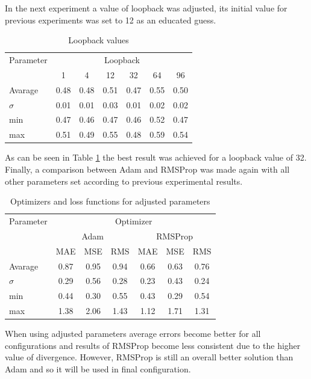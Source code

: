 \documentclass{kybernetika}
\begin{document}
In the next experiment a value of loopback was adjusted, its initial value for previous experiments
was set to 12 as an educated guess.
\begin{table}[htb] 
	\centering
	\caption{Loopback values}
	\label{tab:loopback}
	\begin{tabular}{l*{6}{c}}
		\hline
		\hline
		Parameter& \multicolumn{6}{c}{Loopback}  \\
		& 1& 4& 12& 32& 64& 96\\
		\hline
		Avarage & 0.48 & 0.48 & 0.51 & 0.47 & 0.55 & 0.50  \\
		$\sigma$ & 0.01 & 0.01 & 0.03 & 0.01 & 0.02 & 0.02  \\
		min & 0.47 & 0.46 & 0.47 & 0.46 & 0.52 & 0.47  \\
		max & 0.51 & 0.49 & 0.55 & 0.48 & 0.59 & 0.54  \\
		\hline
		\hline
	\end{tabular}
\end{table}
As can be seen in Table \ref{tab:loopback} the best result was achieved for a loopback value of 32.
Finally, a comparison between Adam and RMSProp was made again with all other parameters 
set according to previous experimental results.
\begin{table}[htb] 
	\centering
	\caption{Optimizers and loss functions for adjusted parameters}
	\label{tab:optimizers2}
	\begin{tabular}{l*{6}{c}}
		\hline
		\hline
		Parameter& \multicolumn{6}{c}{Optimizer}  \\
		&\multicolumn{3}{c}{Adam}&\multicolumn{3}{c}{RMSProp}\\
		\hline
		& MAE & MSE & RMS & MAE & MSE & RMS  \\
		Avarage & 0.87 & 0.95 & 0.94 & 0.66 & 0.63 & 0.76  \\
		$\sigma$ & 0.29 & 0.56 & 0.28 & 0.23 & 0.43 & 0.24  \\
		min & 0.44 & 0.30 & 0.55 & 0.43 & 0.29 & 0.54  \\
		max & 1.38 & 2.06 & 1.43 & 1.12 & 1.71 & 1.31  \\
		\hline
		\hline
	\end{tabular}
\end{table}
When using adjusted parameters average errors become better for all configurations and
results of RMSProp become less consistent due to the higher value of divergence.
However, RMSProp is still an overall better solution than Adam and so it will be used in final
configuration.
\end{document}

